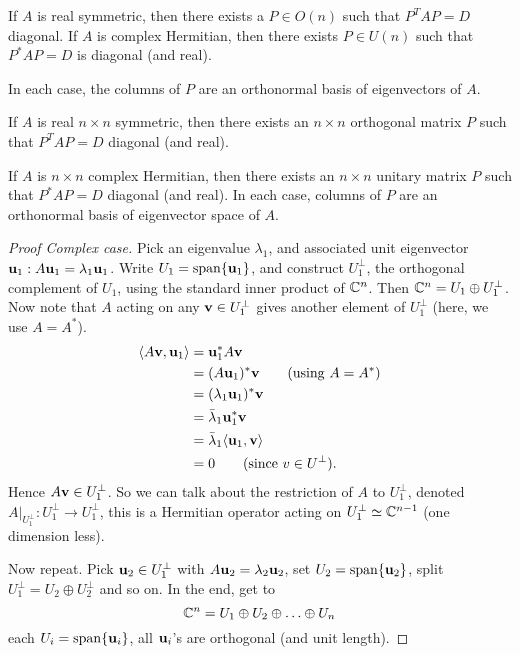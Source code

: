 \documentclass[10pt, a4paper]{article}
\begin{document}
\begin{proposition}
    If $A$ is real symmetric,
    then there exists a $P \in O(n)$  such that $P ^ TAP = D$ diagonal.
    If $A$ is complex Hermitian,
    then there exists $P \in U(n)$ such that $P ^ {*}AP = D$ is diagonal
    (and real).

    In each case,
    the columns of $P$ are an orthonormal basis of eigenvectors of $A$.
\end{proposition}

\begin{proposition}
    If $A$ is real $n \times n$ symmetric,
    then there exists an $n \times n$ orthogonal matrix $P$ such that $P ^ TAP = D$ diagonal
    (and real).

    If $A$ is $n \times n$ complex Hermitian,
    then there exists an $n \times n$ unitary matrix $P$ such that $P ^ {*}AP = D$ diagonal
    (and real).
    In each case,
    columns of $P$ are an orthonormal basis of eigenvector space of $A$.

    \begin{proof}[Proof Complex case]
        Pick an eigenvalue $\lambda_1$,
        and associated unit eigenvector $\mathbf{u}_1 : A\mathbf{u}_1 = \lambda_1\mathbf{u}_1$.
        Write $U_1 = \mathrm{span}\{\mathbf{u}_1\}$,
        and construct $U_1 ^ {\perp}$,
        the orthogonal complement of $U_1$,
        using the standard inner product of $\mathbb{C} ^ n$.
        Then $\mathbb{C} ^ n = U_1 \oplus U_1 ^ {\perp}$.
        Now note that $A$ acting on any $\mathbf{v} \in U_1 ^ {\perp}$ gives another element of $U_1 ^ {\perp}$
        (here,
        we use $A = A ^ {*}$).
        \begin{align*}
            \langle A\mathbf{v}, \mathbf{u}_1\rangle &= \mathbf{u}_1 ^ {*}A\mathbf{v} \\
            &= (A\mathbf{u}_1) ^ {*}\mathbf{v}\qquad(\text{using $A = A ^ {*}$}) \\
            &= (\lambda_1\mathbf{u}_1) ^ {*}\mathbf{v} \\
            &= \bar{\lambda}_1\mathbf{u}_1 ^ {*}\mathbf{v} \\
            &= \bar{\lambda}_1\langle\mathbf{u}_1, \mathbf{v}\rangle \\
            &= 0\qquad(\text{since $v \in U ^ {\perp}$}).
        \end{align*}
        Hence $A\mathbf{v} \in U_1 ^ {\perp}$.
        So we can talk about the restriction of $A$ to $U_1 ^ {\perp}$,
        denoted $A|_{U_1 ^ {\perp}} : U_1 ^ {\perp} \rightarrow U_1 ^ {\perp}$,
        this is a Hermitian operator acting on $U_1 ^ {\perp} \simeq \mathbb{C} ^ {n - 1}$
        (one dimension less).

        Now repeat.
        Pick $\mathbf{u}_2 \in U_1 ^ {\perp}$ with $A\mathbf{u}_2 = \lambda_2\mathbf{u}_2$,
        set $U_2 = \mathrm{span}\{\mathbf{u}_2\}$,
        split $U_1 ^ {\perp} = U_2 \oplus U_2 ^ {\perp}$ and so on.
        In the end,
        get to
        \[
        \mathbb{C} ^ n = U_1 \oplus U_2 \oplus \dotsc \oplus U_n
        \]
        each $U_i = \mathrm{span}\{\mathbf{u}_i\}$,
        all $\mathbf{u}_i$'s are orthogonal
        (and unit length).
    \end{proof}
\end{proposition}
\end{document}
